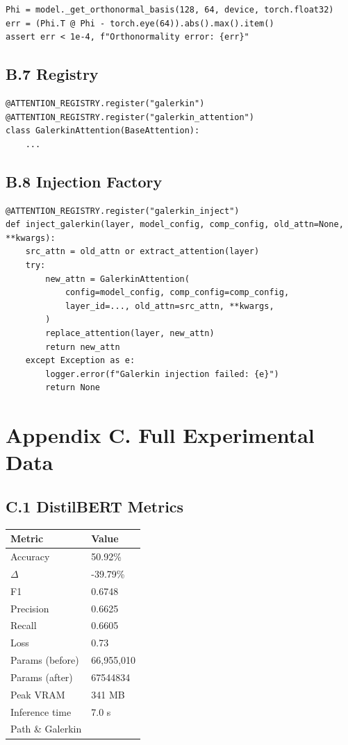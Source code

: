 \begin{lstlisting}
Phi = model._get_orthonormal_basis(128, 64, device, torch.float32)
err = (Phi.T @ Phi - torch.eye(64)).abs().max().item()
assert err < 1e-4, f"Orthonormality error: {err}"
\end{lstlisting}

\subsection{B.7 Registry}

\begin{lstlisting}
@ATTENTION_REGISTRY.register("galerkin")
@ATTENTION_REGISTRY.register("galerkin_attention")
class GalerkinAttention(BaseAttention):
    ...
\end{lstlisting}

\subsection{B.8 Injection Factory}

\begin{lstlisting}
@ATTENTION_REGISTRY.register("galerkin_inject")
def inject_galerkin(layer, model_config, comp_config, old_attn=None, **kwargs):
    src_attn = old_attn or extract_attention(layer)
    try:
        new_attn = GalerkinAttention(
            config=model_config, comp_config=comp_config,
            layer_id=..., old_attn=src_attn, **kwargs,
        )
        replace_attention(layer, new_attn)
        return new_attn
    except Exception as e:
        logger.error(f"Galerkin injection failed: {e}")
        return None
\end{lstlisting}




\section{Appendix C. Full Experimental Data}

\subsection{C.1 DistilBERT Metrics}

\begin{table}[H]
\centering
\small
\begin{tabular}{ll}
\toprule
\textbf{Metric} & \textbf{Value} \\
\midrule
Accuracy & 50.92\% \\
$\Delta$ & -39.79\% \\
F1 & 0.6748 \\
Precision & 0.6625 \\
Recall & 0.6605 \\
Loss & 0.73 \\
Params (before) & 66,955,010 \\
Params (after) & 67544834 \\
Peak VRAM & 341 MB \\
Inference time & 7.0 s \\
Path \& Galerkin \\
\bottomrule
\end{tabular}
\end{table}

